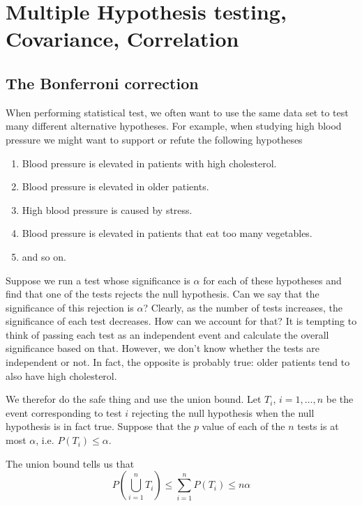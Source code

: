 \chapter{Multiple Hypothesis testing, Covariance, Correlation}

\section{The Bonferroni correction}
When performing statistical test, we often want to use the same data
set to test many different alternative hypotheses. For example, when
studying high blood pressure we might want to support or refute
the following hypotheses
\begin{enumerate}
\item Blood pressure is elevated in patients with high cholesterol.
\item Blood pressure is elevated in older patients.
\item High blood pressure is caused by stress.
\item Blood pressure is elevated in patients that eat too many
  vegetables.
\item and so on.
\end{enumerate}
Suppose we run a test whose significance is $\alpha$ for each of these
hypotheses and find that one of the tests rejects the null
hypothesis. Can we say that the significance of this rejection is
$\alpha$? Clearly, as the number of tests increases, the significance
of each test decreases. How can we account for that? It is tempting to
think of passing each test as an independent event and calculate the
overall significance based on that. However, we don't know whether the
tests are independent or not. In fact, the opposite is probably true:
older patients tend to also have high cholesterol.

We therefor do the safe thing and use the union bound. Let $T_i$,
$i=1,\ldots,n$ be the event corresponding to test $i$ rejecting the
null hypothesis when the null hypothesis is in fact true. Suppose that
the $p$ value of each of the $n$ tests is at most $\alpha$,
i.e. $P(T_i) \leq \alpha$.
 
The union bound tells us that 
\[
P\left( \bigcup_{i=1}^n T_i \right) \leq \sum_{i=1}^n P(T_i) \leq n \alpha
\]

